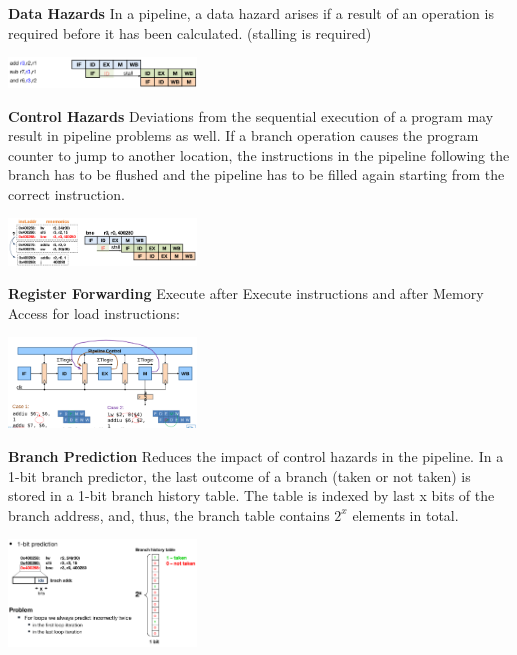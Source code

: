 \documentclass[english]{latex4ei/latex4ei_sheet}
\begin{document}
\textbf{Data Hazards} In a pipeline, a data hazard arises if a result of an operation is required before it has been calculated. (stalling is required)
\begin{center}
	\includegraphics[width = 5cm]{images/4.ProcessorArchitecture/DataHazard.png}
\end{center}

\textbf{Control Hazards} Deviations from the sequential execution of a program may result in pipeline problems as
well. If a branch operation causes the program counter to jump to another location, the instructions in the pipeline following the branch has to be flushed and the pipeline has to be filled again starting from the correct instruction.
\begin{center}
	\includegraphics[width = 5cm]{images/4.ProcessorArchitecture/ControlHazard.png}
\end{center}

\textbf{Register Forwarding}
Execute after Execute instructions and after Memory Access for load instructions:
\begin{center}
	\includegraphics[width = 5cm]{images/4.ProcessorArchitecture/RegisterForwarding.png}
\end{center}

\textbf{Branch Prediction} Reduces the impact of control hazards in the pipeline. In a 1-bit branch predictor, the last outcome of a branch (taken or not taken) is stored in a 1-bit branch history table. The table is indexed by last x bits of the branch address, and, thus, the branch table contains $2^x$ elements in total.
\begin{center}
	\includegraphics[width = 5cm]{images/4.ProcessorArchitecture/1BitPred.png}
\end{center}
\end{document}
